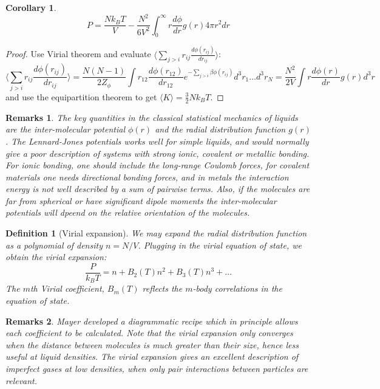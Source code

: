 \documentclass[a4paper]{article}
\newtheorem{remarks}{Remarks}[section]
\theoremstyle{new}
\newtheorem{defi}{Definition}[section]
\newtheorem{cor}{Corollary}[section]
\begin{document}
\begin{cor}
\begin{equation}
    P=\frac{Nk_BT}{V}-\frac{N^2}{6V^2}\int_0^\infty r\frac{d\phi}{dr}g(r)4\pi r^2dr\label{result2}
    \end{equation}
\end{cor}
\begin{proof}
Use Virial theorem and evaluate $\langle\sum_{j>i}r_{ij}\frac{d\phi(r_{ij})}{dr_{ij}}\rangle$:
$$\bigg\langle\sum_{j>i}r_{ij}\frac{d\phi(r_{ij})}{dr_{ij}}\bigg\rangle=\frac{N(N-1)}{2Z_\phi}\int r_{12}\frac{d\phi(r_{12})}{dr_{12}}e^{-\sum_{j>i}\beta\phi(r_{ij})}d^3r_1\dots d^3r_N=\frac{N^2}{2V}\int r\frac{d\phi(r)}{dr}g(r)d^3r$$
and use the equipartition theorem to get $\langle K\rangle=\frac{3}{2}Nk_BT$.
\end{proof}
\begin{remarks}
The key quantities in the classical statistical mechanics of liquids are the inter-molecular potential $\phi(r)$ and the radial distribution function $g(r)$. The Lennard-Jones potentials works well for simple liquids, and would normally give a poor description of systems with strong ionic, covalent or metallic bonding. For ionic bonding, one should include the long-range Coulomb forces, for covalent materials one needs directional bonding forces, and in metals the interaction energy is not well described by a sum of pairwise terms. Also, if the molecules are far from spherical or have significant dipole moments the inter-molecular potentials will dpeend on the relative orientation of the molecules.
\end{remarks}
\begin{defi}[Virial expansion]
We may expand the radial distribution function as a polynomial of density $n=N/V$. Plugging in the virial equation of state, we obtain the virial expansion:
\begin{equation}
\frac{P}{k_BT}=n+B_2(T)n^2+B_3(T)n^3+\dots\label{virialexpansion}
\end{equation}
The $m$th Virial coefficient, $B_m(T)$ reflects the $m$-body correlations in the equation of state.
\end{defi}
\begin{remarks}
Mayer developed a diagrammatic recipe which in principle allows each coefficient to be calculated. Note that the virial expansion only converges when the distance between molecules is much greater than their size, hence less useful at liquid densities. The virial expansion gives an excellent description of imperfect gases at low densities, when only pair interactions between particles are relevant. 
\end{remarks}
\end{document}
